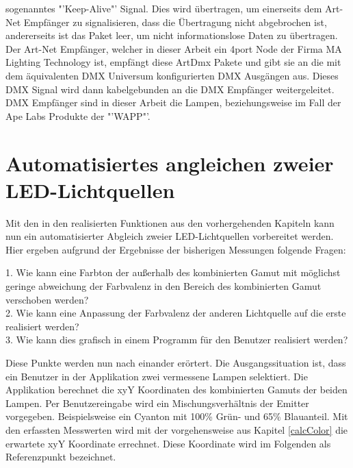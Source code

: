 \documentclass[11pt]{scrartcl}
\begin{document}
sogenanntes "'Keep-Alive"' Signal. Dies wird übertragen, um einerseits dem Art-Net Empfänger zu signalisieren, dass die Übertragung nicht abgebrochen ist,
andererseits ist das Paket leer, um nicht informationslose Daten zu übertragen.\\
Der Art-Net Empfänger, welcher in dieser Arbeit ein 4port Node der Firma MA Lighting Technology ist, empfängt diese ArtDmx Pakete und gibt sie an die mit dem äquivalenten
DMX Universum konfigurierten DMX Ausgängen aus. Dieses DMX Signal wird dann kabelgebunden an die DMX Empfänger weitergeleitet.\\
DMX Empfänger sind in dieser Arbeit die Lampen, beziehungsweise im Fall der Ape Labs Produkte der "'WAPP"'.
\clearpage

\section{Automatisiertes angleichen zweier LED-Lichtquellen} \label{comparing}
Mit den in den realisierten Funktionen aus den vorhergehenden Kapiteln kann nun ein automatisierter Abgleich zweier LED-Lichtquellen vorbereitet werden. Hier
ergeben aufgrund der Ergebnisse der bisherigen Messungen folgende Fragen:\\
\begin{addmargin}[2em]{0em}
    1. Wie kann eine Farbton der außerhalb des kombinierten Gamut mit möglichst geringe abweichung der Farbvalenz in den Bereich des kombinierten Gamut
    verschoben werden?\\
    2. Wie kann eine Anpassung der Farbvalenz der anderen Lichtquelle auf die erste realisiert werden?\\
    3. Wie kann dies grafisch in einem Programm für den Benutzer realisiert werden?\\
\end{addmargin}
Diese Punkte werden nun nach einander erörtert. Die Ausgangssituation ist, dass ein Benutzer in der Applikation zwei vermessene Lampen selektiert. Die
Applikation berechnet die xyY Koordinaten des kombinierten Gamuts der beiden Lampen.
Per Benutzereingabe wird ein Mischungsverhältnis der Emitter vorgegeben. Beispielsweise ein Cyanton mit 100\% Grün- und 65\% Blauanteil. Mit den erfassten
Messwerten wird mit der vorgehensweise aus Kapitel \ref{calcColor} die erwartete xyY Koordinate errechnet. Diese Koordinate wird im Folgenden als
Referenzpunkt bezeichnet.
\end{document}
